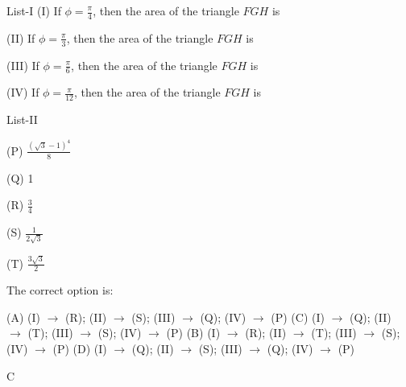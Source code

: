 List-I
(I) If $\phi=\frac{\pi}{4}$, then the area of the triangle $F G H$ is

(II) If $\phi=\frac{\pi}{3}$, then the area of the triangle $F G H$ is

(III) If $\phi=\frac{\pi}{6}$, then the area of the triangle $F G H$ is

(IV) If $\phi=\frac{\pi}{12}$, then the area of the triangle $F G H$ is

List-II

(P) $\frac{(\sqrt{3}-1)^{4}}{8}$

(Q) 1

(R) $\frac{3}{4}$

(S) $\frac{1}{2 \sqrt{3}}$

(T) $\frac{3 \sqrt{3}}{2}$

The correct option is:

(A) (I) $\rightarrow$ (R); (II) $\rightarrow$ (S); (III) $\rightarrow$ (Q); (IV) $\rightarrow$ (P)
(C) (I) $\rightarrow$ (Q); (II) $\rightarrow$ (T); (III) $\rightarrow$ (S); (IV) $\rightarrow$ (P)
(B) (I) $\rightarrow$ (R); (II) $\rightarrow$ (T); (III) $\rightarrow$ (S); (IV) $\rightarrow$ (P)
(D) (I) $\rightarrow$ (Q); (II) $\rightarrow$ (S); (III) $\rightarrow$ (Q); (IV) $\rightarrow$ (P)

C
